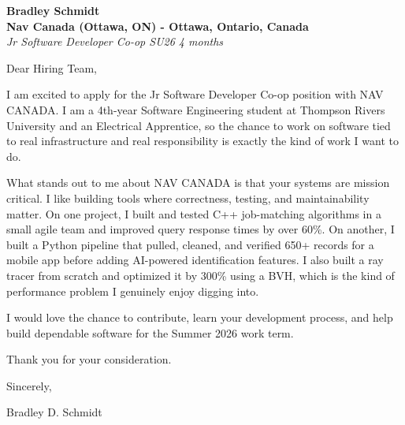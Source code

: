 \documentclass[11pt]{article}
\begin{document}
\textbf{Bradley Schmidt}\\
\vspace{0.5em}
\textbf{Nav Canada (Ottawa, ON) - Ottawa, Ontario, Canada}\\
\textit{Jr Software Developer Co-op SU26 4 months}

Dear Hiring Team,

\par

I am excited to apply for the Jr Software Developer Co-op position with NAV CANADA. I am a 4th-year Software Engineering student at Thompson Rivers University and an Electrical Apprentice, so the chance to work on software tied to real infrastructure and real responsibility is exactly the kind of work I want to do.

\par

What stands out to me about NAV CANADA is that your systems are mission critical. I like building tools where correctness, testing, and maintainability matter. On one project, I built and tested C++ job-matching algorithms in a small agile team and improved query response times by over 60\%. On another, I built a Python pipeline that pulled, cleaned, and verified 650+ records for a mobile app before adding AI-powered identification features. I also built a ray tracer from scratch and optimized it by 300\% using a BVH, which is the kind of performance problem I genuinely enjoy digging into.

\par

I would love the chance to contribute, learn your development process, and help build dependable software for the Summer 2026 work term.

\par

Thank you for your consideration.

\par

Sincerely,

\par

Bradley D. Schmidt
\end{document}
